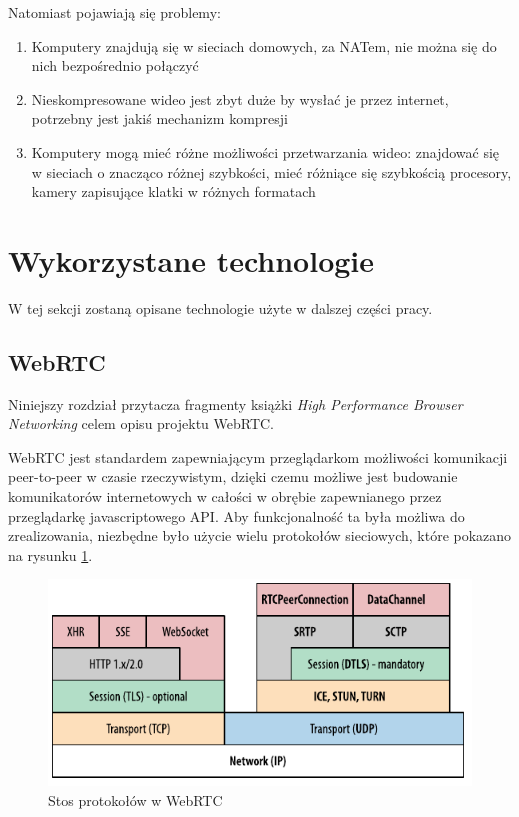 Natomiast pojawiają się problemy:

\begin{enumerate}
    \item Komputery znajdują się w sieciach domowych, za NATem, nie można się do nich bezpośrednio
          połączyć
    \item Nieskompresowane wideo jest zbyt duże by wysłać je przez internet, potrzebny jest jakiś
          mechanizm kompresji
    \item Komputery mogą mieć różne możliwości przetwarzania wideo: znajdować się w sieciach o
          znacząco różnej szybkości, mieć różniące się szybkością procesory, kamery zapisujące
          klatki w różnych formatach
\end{enumerate}

\section{Wykorzystane technologie}

W tej sekcji zostaną opisane technologie użyte w dalszej części pracy.

\subsection{WebRTC}

Niniejszy rozdział przytacza fragmenty książki \emph{High Performance Browser Networking}
\cite{hpbn} celem opisu projektu WebRTC.

WebRTC jest standardem zapewniającym przeglądarkom możliwości komunikacji peer-to-peer w czasie
rzeczywistym, dzięki czemu możliwe jest budowanie komunikatorów internetowych w całości w obrębie
zapewnianego przez przeglądarkę javascriptowego API. Aby funkcjonalność ta była możliwa do
zrealizowania, niezbędne było użycie wielu protokołów sieciowych, które pokazano na rysunku
\ref{fig:webrtc_stack}.

\begin{figure}[htbp]
    \centering
    \includegraphics{img/webrtc-stack_hpbn}
    \caption{Stos protokołów w WebRTC}
    \label{fig:webrtc_stack}
\end{figure}

